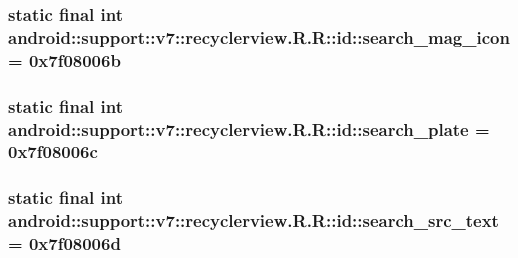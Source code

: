 \hypertarget{classandroid_1_1support_1_1v7_1_1recyclerview_1_1_r_1_1id_18a9c9b7910d82dcebe3a8530e75801a}{
\subsubsection[{search\_\-mag\_\-icon}]{\setlength{\rightskip}{0pt plus 5cm}static final int android::support::v7::recyclerview.R.R::id::search\_\-mag\_\-icon = 0x7f08006b}}
\label{classandroid_1_1support_1_1v7_1_1recyclerview_1_1_r_1_1id_18a9c9b7910d82dcebe3a8530e75801a}


\hypertarget{classandroid_1_1support_1_1v7_1_1recyclerview_1_1_r_1_1id_b007e3c6379c620b71eebc836e5b51f2}{
\subsubsection[{search\_\-plate}]{\setlength{\rightskip}{0pt plus 5cm}static final int android::support::v7::recyclerview.R.R::id::search\_\-plate = 0x7f08006c}}
\label{classandroid_1_1support_1_1v7_1_1recyclerview_1_1_r_1_1id_b007e3c6379c620b71eebc836e5b51f2}


\hypertarget{classandroid_1_1support_1_1v7_1_1recyclerview_1_1_r_1_1id_5f4f8150ea360f3fba20d3ed56d3329f}{
\subsubsection[{search\_\-src\_\-text}]{\setlength{\rightskip}{0pt plus 5cm}static final int android::support::v7::recyclerview.R.R::id::search\_\-src\_\-text = 0x7f08006d}}
\label{classandroid_1_1support_1_1v7_1_1recyclerview_1_1_r_1_1id_5f4f8150ea360f3fba20d3ed56d3329f}


